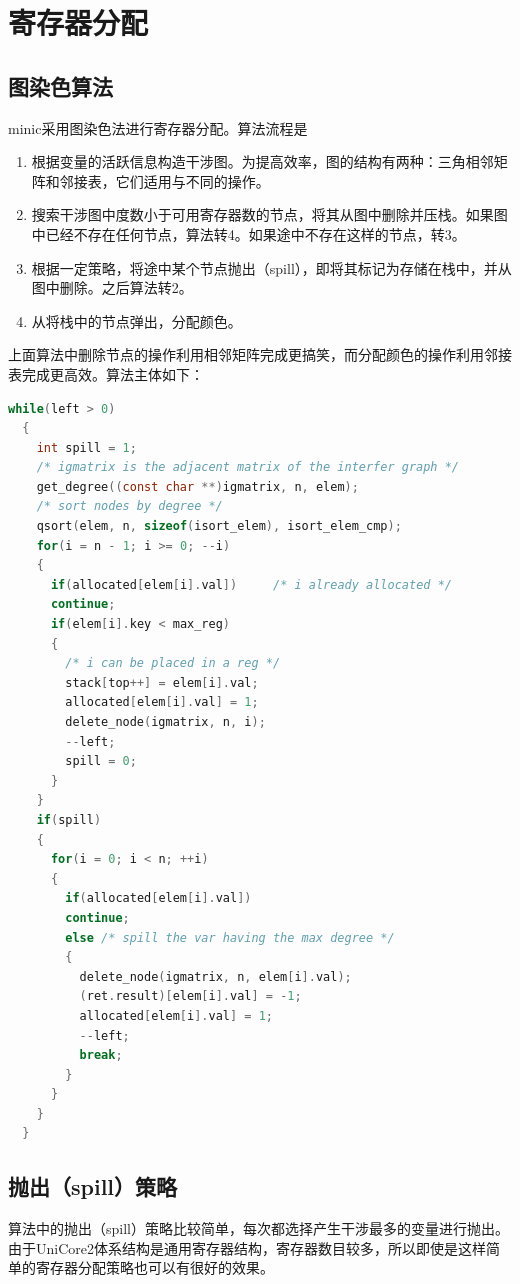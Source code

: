 \documentclass[12pt,a4paper,Flow]{report}
\begin{document}
\section{寄存器分配}
\subsection{图染色算法}
minic采用图染色法进行寄存器分配。算法流程是
\begin{enumerate}
\item 根据变量的活跃信息构造干涉图。为提高效率，图的结构有两种：三角相邻矩阵和邻接表，它们适用与不同的操作。
\item 搜索干涉图中度数小于可用寄存器数的节点，将其从图中删除并压栈。如果图中已经不存在任何节点，算法转4。如果途中不存在这样的节点，转3。
\item 根据一定策略，将途中某个节点抛出（spill），即将其标记为存储在栈中，并从图中删除。之后算法转2。
\item 从将栈中的节点弹出，分配颜色。
\end{enumerate}
上面算法中删除节点的操作利用相邻矩阵完成更搞笑，而分配颜色的操作利用邻接表完成更高效。算法主体如下：
\begin{lstlisting}[language=c]
  while(left > 0)
  {
    int spill = 1;
    /* igmatrix is the adjacent matrix of the interfer graph */
    get_degree((const char **)igmatrix, n, elem);
    /* sort nodes by degree */
    qsort(elem, n, sizeof(isort_elem), isort_elem_cmp);
    for(i = n - 1; i >= 0; --i)
    {
      if(allocated[elem[i].val])     /* i already allocated */
      continue;
      if(elem[i].key < max_reg)
      {
        /* i can be placed in a reg */
        stack[top++] = elem[i].val;     
        allocated[elem[i].val] = 1;
        delete_node(igmatrix, n, i);
        --left;
        spill = 0;
      }
    }
    if(spill)
    {
      for(i = 0; i < n; ++i)
      {
        if(allocated[elem[i].val])
        continue;
        else /* spill the var having the max degree */
        {
          delete_node(igmatrix, n, elem[i].val);
          (ret.result)[elem[i].val] = -1;
          allocated[elem[i].val] = 1;
          --left;
          break;
        }
      }
    }
  }
\end{lstlisting}
\subsection{抛出（spill）策略}
算法中的抛出（spill）策略比较简单，每次都选择产生干涉最多的变量进行抛出。由于UniCore2体系结构是通用寄存器结构，寄存器数目较多，所以即使是这样简单的寄存器分配策略也可以有很好的效果。
\end{document}

